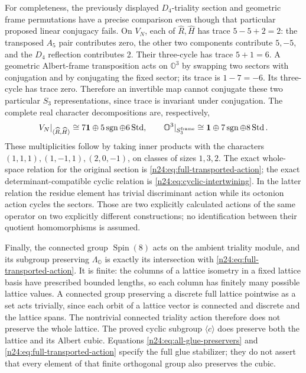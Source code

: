 For completeness, the previously displayed \(D_4\)-triality
section and geometric frame permutations have a precise comparison
even though that particular proposed linear conjugacy fails.  On
\(V_N\), each of \(\widehat R,\widehat H\) has trace
\(5-5+2=2\): the transposed \(A_5\) pair contributes zero,
the other two components contribute \(5,-5\), and the
\(D_4\) reflection contributes 2.  Their three-cycle has trace
\(5+1=6\).  A geometric Albert-frame transposition acts on
\(\mathbb O^3\) by swapping two sectors with conjugation and by
conjugating the fixed sector; its trace is
\(1-7=-6\).  Its three-cycle has trace zero.  Therefore an
invertible map cannot conjugate these two particular \(S_3\)
representations, since trace is invariant under conjugation.
The complete real character decompositions are, respectively,
\[
 V_N|_{\langle\widehat R,\widehat H\rangle}
       \cong7\mathbf1\oplus5\operatorname{sgn}\oplus6\operatorname{Std},
 \qquad
 \mathbb O^3|_{S_3^{\rm frame}}
       \cong\mathbf1\oplus7\operatorname{sgn}\oplus8\operatorname{Std}.
\]
These multiplicities follow by taking inner products with the
characters \((1,1,1),(1,-1,1),(2,0,-1)\), on classes of sizes
\(1,3,2\).  The exact whole-space relation for the original section
is \eqref{n24:eq:full-transported-action}; the exact
determinant-compatible cyclic relation is
\eqref{n24:eq:cyclic-intertwining}.  In the latter relation the
residue element has trivial discriminant action while its octonion
action cycles the sectors.  Those are two explicitly calculated
actions of the same operator on two explicitly different constructions;
no identification between their quotient homomorphisms is assumed.

Finally, the connected group \(\operatorname{Spin}(8)\) acts on
the ambient triality module, and its subgroup preserving
\(\Lambda_{\mathbb O}\) is exactly its intersection with
\eqref{n24:eq:full-transported-action}.  It is finite: the columns
of a lattice isometry in a fixed lattice basis have prescribed
bounded lengths, so each column has finitely many possible lattice
values.  A connected group preserving a discrete full lattice
pointwise as a set acts trivially, since each orbit of a lattice
vector is connected and discrete and the lattice spans.  The
nontrivial connected triality action therefore does not preserve
the whole lattice.  The proved cyclic subgroup \(\langle c\rangle\)
does preserve both the lattice and its Albert cubic.  Equations
\eqref{n24:eq:all-glue-preservers} and
\eqref{n24:eq:full-transported-action} specify the full glue
stabilizer; they do not assert that every element of that finite
orthogonal group also preserves the cubic.
